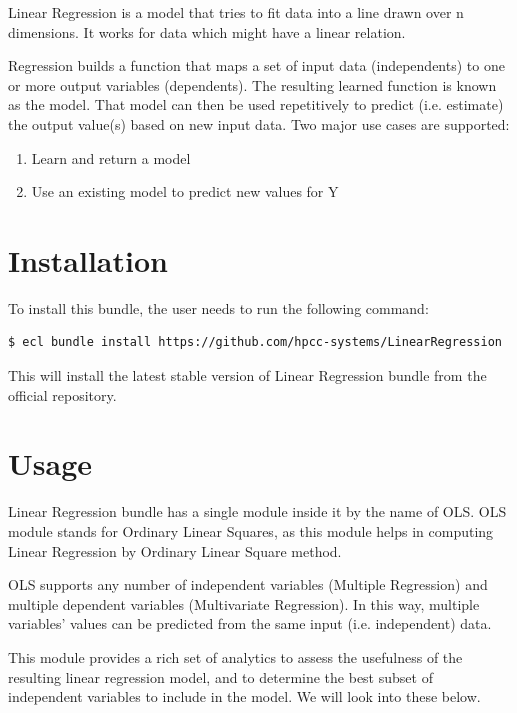 \documentclass[a4paper,oneside,12pt]{book}
\begin{document}
Linear Regression is a model that tries to fit data into a line drawn over n dimensions. It works for data which might have a linear relation.

Regression builds a function that maps a set of input data (independents) to one or more output variables (dependents). The resulting learned function is known as the model. That model can then be used repetitively to predict (i.e. estimate) the output value(s) based on new input data. Two major use cases are supported:

\begin{enumerate}
    \item Learn and return a model
    \item Use an existing model to predict new values for Y
\end{enumerate}

\section{Installation}

To install this bundle, the user needs to run the following command:

\begin{lstlisting}[language=bash]
$ ecl bundle install https://github.com/hpcc-systems/LinearRegression
\end{lstlisting}

This will install the latest stable version of Linear Regression bundle from the official repository.

\section{Usage}

Linear Regression bundle has a single module inside it by the name of OLS. OLS module stands for Ordinary Linear Squares, as this module helps in computing Linear Regression by Ordinary Linear Square method.

OLS supports any number of independent variables (Multiple Regression) and multiple dependent variables (Multivariate Regression). In this way, multiple variables’ values can be predicted from the same input (i.e. independent) data.

This module provides a rich set of analytics to assess the usefulness of the resulting linear regression model, and to determine the best subset of independent variables to include in the model. We will look into these below.
\end{document}
